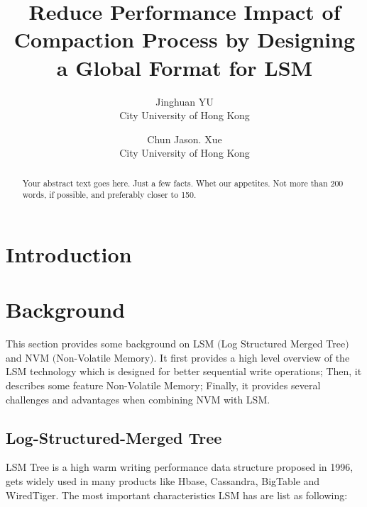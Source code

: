 \usepackage{filecontents}




\date{}

\title{\Large \bf Reduce Performance Impact of Compaction Process by Designing a Global Format for LSM}

\author{
{\rm Jinghuan YU}\\
City University of Hong Kong
\and
{\rm Chun Jason. Xue}\\
City University of Hong Kong
} %

\maketitle

\begin{abstract}
Your abstract text goes here. Just a few facts. Whet our appetites.
Not more than 200 words, if possible, and preferably closer to 150.
\end{abstract}


\section{Introduction}

\section{Background}
This section provides some background on LSM $($Log Structured Merged Tree$)$ and NVM $($Non-Volatile Memory$)$. It first provides a high level overview of the LSM technology which is designed for better sequential write operations; Then, it describes some feature Non-Volatile Memory; Finally, it provides several challenges and advantages when combining NVM with LSM.

\subsection{Log-Structured-Merged Tree}\label{LSM-introduction}
LSM Tree is a high warm writing performance data structure proposed in 1996\cite{o1996log}, gets widely used in many products like Hbase\cite{ApacheHB26:online}, Cassandra\cite{ApacheCa22:online}, BigTable\cite{chang2008bigtable} and WiredTiger\cite{WiredTig38:online}.  The most important characteristics LSM has are list as following:

